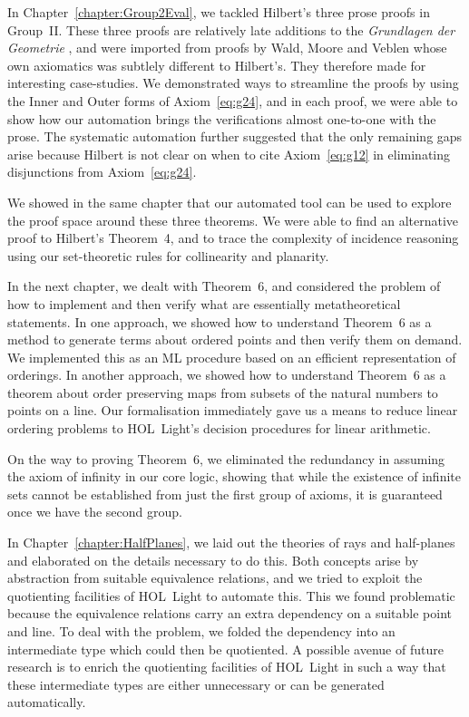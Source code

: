 In Chapter~\ref{chapter:Group2Eval}, we tackled Hilbert's three prose proofs in Group~II. These three proofs are relatively late additions to the \emph{Grundlagen der Geometrie} , and were imported from proofs by Wald, Moore and Veblen whose own axiomatics was subtlely different to Hilbert's. They therefore made for interesting case-studies. We demonstrated ways to streamline the proofs by using the Inner and Outer forms of Axiom~\ref{eq:g24}, and in each proof, we were able to show how our automation brings the verifications almost one-to-one with the prose. The systematic automation further suggested that the only remaining gaps arise because Hilbert is not clear on when to cite Axiom~\ref{eq:g12} in eliminating disjunctions from Axiom~\ref{eq:g24}. 

We showed in the same chapter that our automated tool can be used to explore the proof space around these three theorems. We were able to find an alternative proof to Hilbert's Theorem~4, and to trace the complexity of incidence reasoning using our set-theoretic rules for collinearity and planarity.

In the next chapter, we dealt with Theorem~6, and considered the problem of how to implement and then verify what are essentially metatheoretical statements. In one approach, we showed how to understand Theorem~6 as a method to generate terms about ordered points and then verify them on demand. We implemented this as an ML procedure based on an efficient representation of orderings. In another approach, we showed how to understand Theorem~6 as a theorem about order preserving maps from subsets of the natural numbers to points on a line. Our formalisation immediately gave us a means to reduce linear ordering problems to HOL~Light's decision procedures for linear arithmetic.

On the way to proving Theorem~6, we eliminated the redundancy in assuming the axiom of infinity in our core logic, showing that while the existence of infinite sets cannot be established from just the first group of axioms, it is guaranteed once we have the second group. 

In Chapter~\ref{chapter:HalfPlanes}, we laid out the theories of rays and half-planes and elaborated on the details necessary to do this. Both concepts arise by abstraction from suitable equivalence relations, and we tried to exploit the quotienting facilities of HOL~Light to automate this. This we found problematic because the equivalence relations carry an extra dependency on a suitable point and line. To deal with the problem, we folded the dependency into an intermediate type which could then be quotiented. A possible avenue of future research is to enrich the quotienting facilities of HOL~Light in such a way that these intermediate types are either unnecessary or can be generated automatically.

